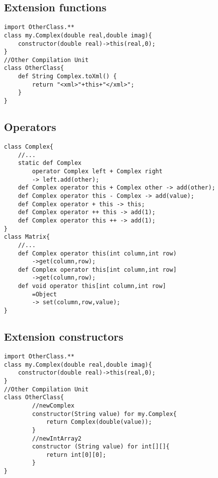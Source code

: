 \documentclass{tufte-book}
\begin{document}
            \subsection{Extension functions}
            \begin{lstlisting}
import OtherClass.**
class my.Complex(double real,double imag){
    constructor(double real)->this(real,0);
}
//Other Compilation Unit
class OtherClass{
    def String Complex.toXml() {
        return "<xml>"+this+"</xml>";
    }
}
            \end{lstlisting}


            \subsection{Operators}

                \begin{lstlisting}
class Complex{
    //...
    static def Complex 
        operator Complex left + Complex right 
        -> left.add(other);
    def Complex operator this + Complex other -> add(other);
    def Complex operator this - Complex -> add(value);
    def Complex operator + this -> this;
    def Complex operator ++ this -> add(1);
    def Complex operator this ++ -> add(1);
}
class Matrix{
    //...
    def Complex operator this(int column,int row)
        ->get(column,row);
    def Complex operator this[int column,int row]
        ->get(column,row);
    def void operator this[int column,int row]
        =Object
        -> set(column,row,value);
}
                \end{lstlisting}

            
            \subsection{Extension constructors}
            \begin{lstlisting}
import OtherClass.**
class my.Complex(double real,double imag){
    constructor(double real)->this(real,0);
}
//Other Compilation Unit
class OtherClass{
        //newComplex
        constructor(String value) for my.Complex{
            return Complex(double(value));
        }
        //newIntArray2
        constructor (String value) for int[][]{
            return int[0][0];
        }
}
            \end{lstlisting}
\end{document}
